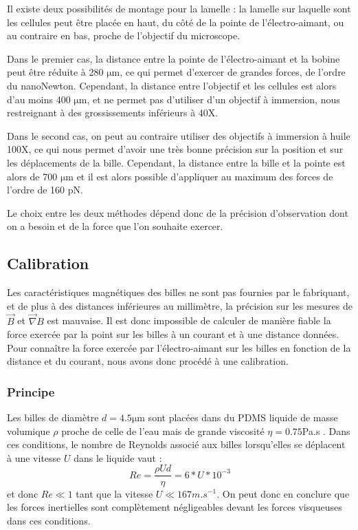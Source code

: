 \documentclass{report}
\newcommand{\micro}{$\mathrm{\mu}$}
\begin{document}
		 Il existe deux possibilités de montage pour la lamelle : la lamelle sur laquelle sont les cellules peut être placée en haut, du côté de la pointe de l'électro-aimant, ou au contraire en bas, proche de l'objectif du microscope. 
		 
		 Dans le premier cas, la distance entre la pointe de l'électro-aimant et la bobine peut être réduite à 280 \micro m, ce qui permet d'exercer de grandes forces, de l'ordre du nanoNewton. Cependant, la distance entre l'objectif et les cellules est alors d'au moins 400 \micro m, et ne permet pas d'utiliser d'un objectif à immersion, nous restreignant à des grossissements inférieurs à 40X. 

		 Dans le second cas, on peut au contraire utiliser des objectifs à immersion à huile 100X, ce qui nous permet d'avoir une très bonne précision sur la position et sur les déplacements de la bille. Cependant, la distance entre la bille et la pointe est alors de 700 \micro m et il est alors possible d'appliquer au maximum des forces de l'ordre de 160 pN. 
		 
Le choix entre les deux méthodes dépend donc de la précision d'observation dont on a besoin et de la force que l'on souhaite exercer. 

		 
		 
		 		 
		  
		
		
	\subsection{Calibration}
  
 Les caractéristiques magnétiques des billes ne sont pas fournies par le fabriquant, et de plus à des distances inférieures au millimètre, la précision sur les mesures de $\vec{B}$ et $\vec{\nabla}B$ est mauvaise. 
 Il est donc impossible de calculer de manière fiable la force exercée par la point sur les billes à un courant et à une distance données.
 Pour connaître la force exercée par l'électro-aimant sur les billes en fonction de la distance et du courant, nous avons donc procédé à une calibration.
 
 \subsubsection{Principe}
 
 Les billes de diamètre $d=4.5$\micro m sont placées dans du PDMS liquide de masse volumique $\rho$ proche de celle de l'eau mais de grande viscosité $\eta=0.75$Pa.s . 
 Dans ces conditions, le nombre de Reynolds associé aux billes lorsqu'elles se déplacent à une vitesse $U$ dans le liquide vaut : $$Re = \frac{\rho U d }{\eta}=6*U*10^{-3}$$
 et donc $Re \ll 1$ tant que la vitesse $U \ll 167 m.s^{-1}$. 
 On peut donc en conclure que les forces inertielles sont complètement négligeables devant les forces visqueuses dans ces conditions. 
 
\end{document}
